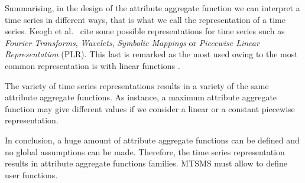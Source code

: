 


Summarising, in the design of the attribute aggregate function we can
interpret a time series in different ways, that is what we call the
representation of a time series. Keogh et al.\ \cite{last:keogh} cite
some possible representations for time series such as \emph{Fourier
  Transforms}, \emph{Wavelets}, \emph{Symbolic Mappings} or
\emph{Piecewise Linear Representation} (PLR). This last is remarked as
the most used owing to the most common representation is with linear
functions \cite{keogh01}.

The variety of time series representations results in a variety of the
same attribute aggregate functions. As instance, a maximum attribute
aggregate function may give different values if we consider a linear
or a constant piecewise representation. 

In conclusion, a huge amount of attribute aggregate functions can be
defined and no global assumptions can be made.  Therefore, the time
series representation results in attribute aggregate functions
families.  MTSMS must allow to define
user functions.








